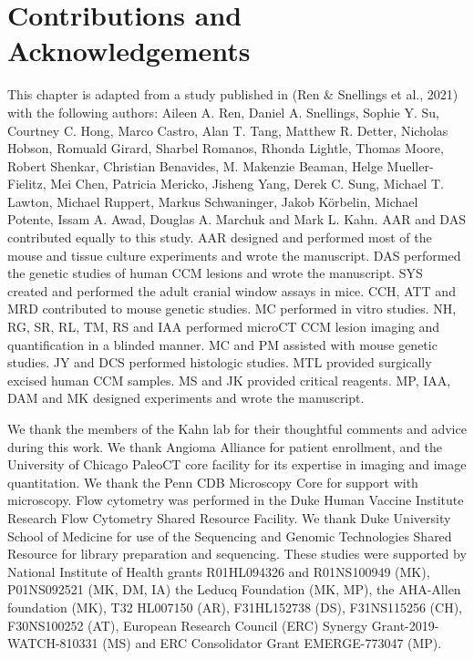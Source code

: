\section{Contributions and Acknowledgements}
This chapter is adapted from a study published in  (Ren \& Snellings et al., 2021) with the following authors:  Aileen A. Ren, Daniel A. Snellings, Sophie Y. Su, Courtney C. Hong, Marco Castro, Alan T. Tang, Matthew R. Detter, Nicholas Hobson, Romuald Girard, Sharbel Romanos, Rhonda Lightle, Thomas Moore, Robert Shenkar, Christian Benavides, M. Makenzie Beaman, Helge Mueller-Fielitz,  Mei Chen, Patricia Mericko, Jisheng Yang, Derek C. Sung, Michael T. Lawton, Michael Ruppert, Markus Schwaninger, Jakob K\"{o}rbelin, Michael Potente, Issam A. Awad, Douglas A. Marchuk and Mark L. Kahn. AAR and DAS contributed equally to this study. AAR designed and performed most of the mouse and tissue culture experiments and wrote the manuscript. DAS performed the genetic studies of human CCM lesions and wrote the manuscript. SYS created and performed the adult cranial window assays in mice. CCH, ATT and MRD contributed to mouse genetic studies. MC performed in vitro studies. NH, RG, SR, RL, TM, RS and IAA performed microCT CCM lesion imaging and quantification in a blinded manner. MC and PM assisted with mouse genetic studies. JY and DCS performed histologic studies. MTL provided surgically excised human CCM samples. MS and JK provided critical reagents. MP, IAA, DAM and MK designed experiments and wrote the manuscript.

We thank the members of the Kahn lab for their thoughtful comments and advice during this work. We thank Angioma Alliance for patient enrollment, and the University of Chicago PaleoCT core facility for its expertise in imaging and image quantitation. We thank the Penn CDB Microscopy Core for support with microscopy. Flow cytometry was performed in the Duke Human Vaccine Institute Research Flow Cytometry Shared Resource Facility. We thank Duke University School of Medicine for use of the Sequencing and Genomic Technologies Shared Resource for library preparation and sequencing. These studies were supported by National Institute of Health grants R01HL094326 and R01NS100949 (MK), P01NS092521 (MK, DM, IA) the Leducq Foundation (MK, MP), the AHA-Allen foundation (MK), T32 HL007150 (AR), F31HL152738 (DS), F31NS115256 (CH), F30NS100252 (AT), European Research Council (ERC) Synergy Grant-2019-WATCH-810331 (MS) and ERC Consolidator Grant EMERGE-773047 (MP).

